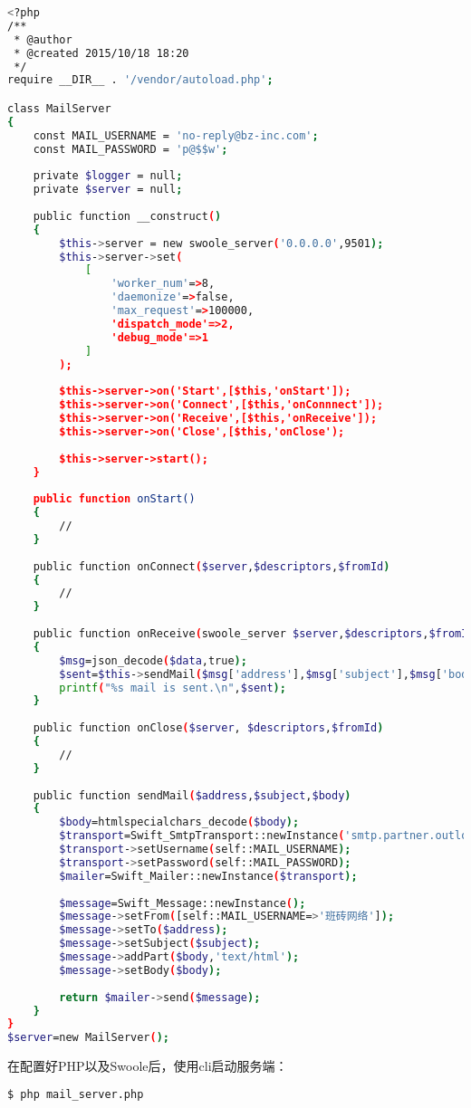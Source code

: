 \begin{lstlisting}[language=bash,basicstyle=\ttfamily\footnotesize]
<?php
/**
 * @author 
 * @created 2015/10/18 18:20
 */
require __DIR__ . '/vendor/autoload.php';

class MailServer
{
	const MAIL_USERNAME = 'no-reply@bz-inc.com';
	const MAIL_PASSWORD = 'p@$$w';
	
	private $logger = null;
	private $server = null;
	
	public function __construct()
	{
		$this->server = new swoole_server('0.0.0.0',9501);
		$this->server->set(
			[
				'worker_num'=>8,
				'daemonize'=>false,
				'max_request'=>100000,
				'dispatch_mode'=>2,
				'debug_mode'=>1
			]
		);
		
		$this->server->on('Start',[$this,'onStart']);
		$this->server->on('Connect',[$this,'onConnnect']);
		$this->server->on('Receive',[$this,'onReceive']);
		$this->server->on('Close',[$this,'onClose');
		
		$this->server->start();
	}
	
	public function onStart()
	{
		//
	}
	
	public function onConnect($server,$descriptors,$fromId)
	{
		//
	}
	
	public function onReceive(swoole_server $server,$descriptors,$fromId,$data)
	{
		$msg=json_decode($data,true);
		$sent=$this->sendMail($msg['address'],$msg['subject'],$msg['body']);
		printf("%s mail is sent.\n",$sent);
	}
	
	public function onClose($server, $descriptors,$fromId)
	{
		//
	}
	
	public function sendMail($address,$subject,$body)
	{
		$body=htmlspecialchars_decode($body);
		$transport=Swift_SmtpTransport::newInstance('smtp.partner.outlook.cn',587,'tls');
		$transport->setUsername(self::MAIL_USERNAME);
		$transport->setPassword(self::MAIL_PASSWORD);
		$mailer=Swift_Mailer::newInstance($transport);
		
		$message=Swift_Message::newInstance();
		$message->setFrom([self::MAIL_USERNAME=>'班砖网络']);
		$message->setTo($address);
		$message->setSubject($subject);
		$message->addPart($body,'text/html');
		$message->setBody($body);
		
		return $mailer->send($message);
	}
}
$server=new MailServer();
\end{lstlisting}


在配置好PHP以及Swoole后，使用cli启动服务端：

\begin{lstlisting}[language=bash]
$ php mail_server.php
\end{lstlisting}

